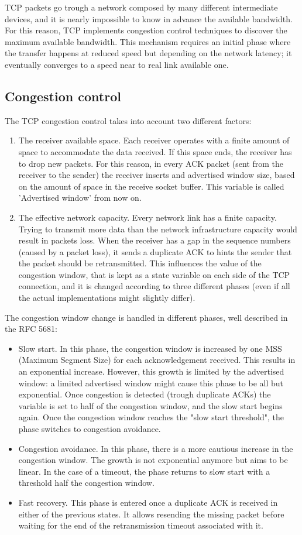 \documentclass[a4paper,10pt]{article}
\begin{document}
TCP packets go trough a network composed by many different intermediate devices, and it is nearly impossible to know in advance the available bandwidth. For this reason, TCP implements congestion control techniques to discover the maximum available bandwidth. This mechanism requires an initial phase where the transfer happens at reduced speed but depending on the network latency; it eventually converges to a speed near to real link available one.

\subsection{Congestion control}
The TCP congestion control takes into account two different factors: 
\begin{enumerate}
   \item The receiver available space. Each receiver operates with a finite amount of space to accommodate the data received. If this space ends, the receiver has to drop new packets. For this reason, in every ACK packet (sent from the receiver to the sender) the receiver inserts and advertised window size, based on the amount of space in the receive socket buffer. This variable is called 'Advertised window' from now on. 
   \item The effective network capacity. Every network link has a finite capacity. Trying to transmit more data than the network infrastructure capacity would result in packets loss. When the receiver has a gap in the sequence numbers (caused by a packet loss), it sends a duplicate ACK to hints the sender that the packet should be retransmitted. This influences the value of the congestion window, that is kept as a state variable on each side of the TCP connection, and it is changed according to three different phases (even if all the actual implementations might slightly differ).
\end{enumerate}
The congestion window change is handled in different phases, well described in the RFC 5681\cite{RFC_5681}:
\begin{itemize}
   \item Slow start. In this phase, the congestion window is increased by one MSS (Maximum Segment Size) for each acknowledgement received. This results in an exponential increase. However, this growth is limited by the advertised window: a limited advertised window might cause this phase to be all but exponential. Once congestion is detected (trough duplicate ACKs) the variable  is set to half of the congestion window, and the slow start begins again. Once the congestion window reaches the "slow start threshold", the phase switches to congestion avoidance.
   \item Congestion avoidance. In this phase, there is a more cautious increase in the congestion window. The growth is not exponential anymore but aims to be linear. In the case of a timeout, the phase returns to slow start with a threshold half the congestion window.
   \item Fast recovery. This phase is entered once a duplicate ACK is received in either of the previous states. It allows resending the missing packet before waiting for the end of the retransmission timeout associated with it.
\end{itemize}
\end{document}
